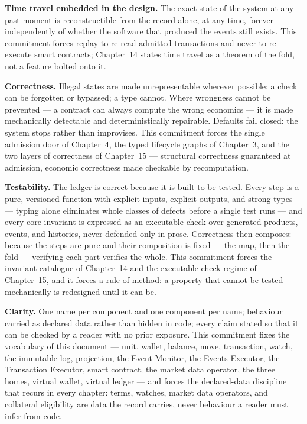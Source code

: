 \textbf{Time travel embedded in the design.} The exact state of the system at any past
moment is reconstructible from the record alone, at any time, forever ---
independently of whether the software that produced the events still exists. This
commitment forces replay to re-read admitted transactions and never to re-execute
smart contracts; Chapter~14 states time travel as a theorem of the fold, not a feature
bolted onto it.

\textbf{Correctness.} Illegal states are made unrepresentable wherever possible: a
check can be forgotten or bypassed; a type cannot. Where wrongness cannot be prevented
--- a contract can always compute the wrong economics --- it is made mechanically
detectable and deterministically repairable. Defaults fail closed: the system stops
rather than improvises. This commitment forces the single admission door of
Chapter~4, the typed lifecycle graphs of Chapter~3, and the two layers of correctness
of Chapter~15 --- structural correctness guaranteed at admission, economic correctness
made checkable by recomputation.

\textbf{Testability.} The ledger is correct because it is built to be tested. Every
step is a pure, versioned function with explicit inputs, explicit outputs, and strong
types --- typing alone eliminates whole classes of defects before a single test runs
--- and every core invariant is expressed as an executable check over generated
products, events, and histories, never defended only in prose. Correctness then
composes: because the steps are pure and their composition is fixed --- the map, then
the fold --- verifying each part verifies the whole. This commitment forces the
invariant catalogue of Chapter~14 and the executable-check regime of Chapter~15, and
it forces a rule of method: a property that cannot be tested mechanically is
redesigned until it can be.

\textbf{Clarity.} One name per component and one component per name; behaviour carried
as declared data rather than hidden in code; every claim stated so that it can be
checked by a reader with no prior exposure. This commitment fixes the vocabulary of
this document --- unit, wallet, balance, move, transaction, watch, the immutable log,
projection, the Event Monitor, the Events Executor, the Transaction Executor, smart
contract, the market data operator, the three homes, virtual wallet, virtual ledger
--- and forces the declared-data discipline that recurs in every chapter: terms,
watches, market data operators, and collateral eligibility are data the record
carries, never behaviour a reader must infer from code.

